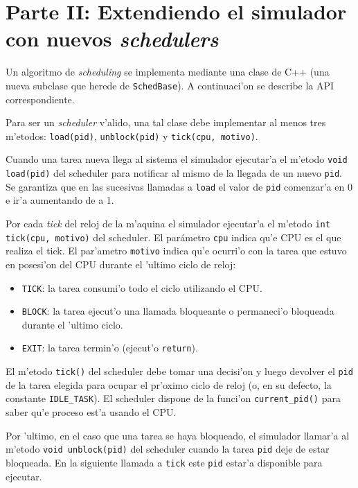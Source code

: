 \documentclass[a4paper,11pt]{article}
\begin{document}
\section*{Parte II: Extendiendo el simulador con nuevos \emph{schedulers}}

Un algoritmo de \emph{scheduling} se implementa mediante una clase de C++
(una nueva subclase que herede de \texttt{SchedBase}). A continuaci'on se
describe la API correspondiente.

Para ser un \emph{scheduler} v'alido, una tal clase debe implementar al
menos tres m'etodos: \texttt{load(pid)}, \texttt{unblock(pid)} y \texttt{tick(cpu, motivo)}.

Cuando una tarea nueva llega al sistema el simulador ejecutar'a el m'etodo
\texttt{void load(pid)} del scheduler para notificar al mismo de la llegada
de un nuevo \texttt{pid}. Se garantiza que en las sucesivas llamadas a \texttt{load}
el valor de \texttt{pid} comenzar'a en 0 e ir'a aumentando de a 1.

Por cada \emph{tick} del reloj de la m'aquina el simulador ejecutar'a
el m'etodo \texttt{int tick(cpu, motivo)} del scheduler. El parámetro \texttt{cpu} indica qu'e CPU es el que realiza el tick. El par'ametro
\texttt{motivo} indica qu'e ocurri'o con la tarea que estuvo en posesi'on
del CPU durante el 'ultimo ciclo de reloj:
\begin{itemize}
        \item \texttt{TICK}: la tarea consumi'o todo el ciclo utilizando el CPU.
        \item \texttt{BLOCK}: la tarea ejecut'o una llamada
        bloqueante o permaneci'o bloqueada durante el 'ultimo ciclo.
        \item \texttt{EXIT}: la tarea termin'o (ejecut'o \texttt{return}).
\end{itemize}

El m'etodo \texttt{tick()} del scheduler debe tomar una decisi'on y luego
devolver el \texttt{pid} de la tarea elegida para ocupar el pr'oximo ciclo
de reloj (o, en su defecto, la constante \texttt{IDLE\_TASK}).
El scheduler dispone de la funci'on \texttt{current\_pid()} para saber
qu'e proceso est'a usando el CPU.

\medskip
Por 'ultimo, en el caso que una tarea se haya bloqueado, el simulador llamar'a al m'etodo
\texttt{void unblock(pid)} del scheduler cuando la tarea \texttt{pid} deje de estar bloqueada.
En la siguiente llamada a \texttt{tick} este \texttt{pid} estar'a disponible
para ejecutar.
\end{document}
